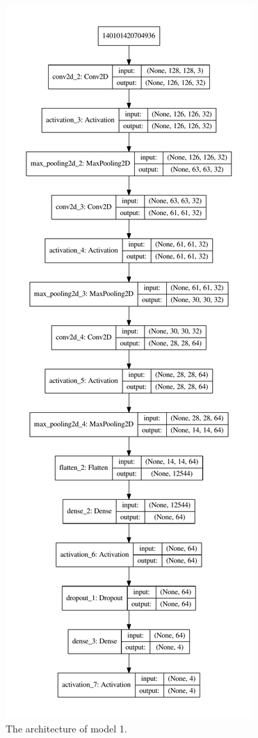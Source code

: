 \documentclass[10pt,a4paper]{article}
\begin{document}
\newpage
\begin{figure}[h]
\centering
\includegraphics[scale=0.43]{model1_plot.pdf}
\caption{The architecture of model 1.}
\label{fig: model1}
\end{figure}
\end{document}
